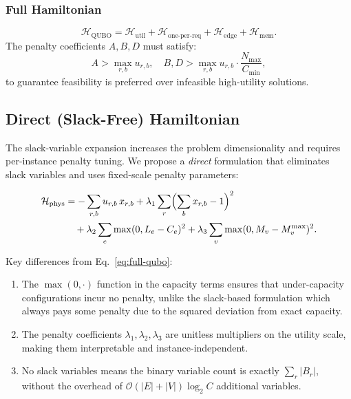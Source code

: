 \documentclass[10pt,a4paper]{article}
\newcommand{\calH}{\mathcal{H}}
\begin{document}
\subsubsection{Full Hamiltonian}
\begin{equation}
  \calH_{\text{QUBO}} = \calH_{\text{util}} + \calH_{\text{one-per-req}}
    + \calH_{\text{edge}} + \calH_{\text{mem}}.
\label{eq:full-qubo}
\end{equation}
The penalty coefficients $A, B, D$ must satisfy:
\begin{equation}
  A > \max_{r,b} u_{r,b}, \quad
  B, D > \max_{r,b} u_{r,b} \cdot \frac{N_{\max}}{C_{\min}},
\end{equation}
to guarantee feasibility is preferred over infeasible high-utility
solutions.

\subsection{Direct (Slack-Free) Hamiltonian}
\label{sec:direct-ham}

The slack-variable expansion increases the problem dimensionality and
requires per-instance penalty tuning.  We propose a \emph{direct}
formulation that eliminates slack variables and uses
fixed-scale penalty parameters:

\begin{align}
  \calH_{\text{phys}} &=
    -\sum_{r,b} u_{r,b} \, x_{r,b}
    + \lambda_1 \sum_r \Bigl(\sum_b x_{r,b} - 1\Bigr)^2 \nonumber\\
    &\quad + \lambda_2 \sum_e \max(0, L_e - C_e)^2
    + \lambda_3 \sum_v \max(0, M_v - M_v^{\max})^2.
\label{eq:direct-ham}
\end{align}

Key differences from Eq.~\eqref{eq:full-qubo}:
\begin{enumerate}
  \item The $\max(0, \cdot)$ function in the capacity terms ensures
    that under-capacity configurations incur no penalty, unlike the
    slack-based formulation which always pays some penalty due to the
    squared deviation from exact capacity.
  \item The penalty coefficients $\lambda_1, \lambda_2, \lambda_3$ are
    unitless multipliers on the utility scale, making them
    interpretable and instance-independent.
  \item No slack variables means the binary variable count is exactly
    $\sum_r |B_r|$, without the overhead of
    $\mathcal{O}(|E| + |V|) \log_2 C$ additional variables.
\end{enumerate}
\end{document}
